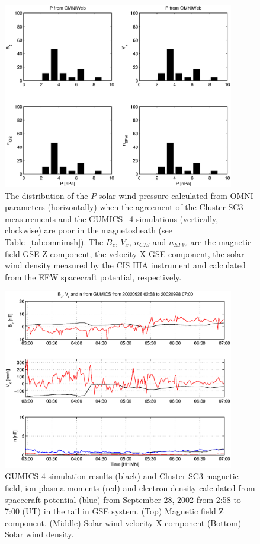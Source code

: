 \documentclass[linenumbers,draft]{agujournal}
\begin{document}
\begin{figure}[h]
\centering
\includegraphics[width=0.9\textwidth,angle=0]{swe-2020-corr-f18.eps}  
\caption{The distribution of the $P$ solar wind pressure calculated from OMNI parameters (horizontally) when the agreement of the Cluster SC3 measurements and the GUMICS$-$4 simulations (vertically, clockwise) are poor in the magnetosheath (see Table~\ref{tab:omnimsh}). The $B_{z}$, $V_{x}$, $n_{CIS}$ and $n_{EFW}$ are the magnetic field GSE Z component, the velocity X GSE component, the solar wind density measured by the CIS HIA instrument and calculated from the EFW spacecraft potential, respectively.}
\label{fig:mshomnip}
\end{figure}

\pagebreak

\begin{figure}[h]
\centering
\includegraphics[width=0.9\textwidth,angle=0]{swe-2020-corr-f19.eps}  
\caption{GUMICS-4 simulation results (black) and Cluster SC3 magnetic field, ion plasma moments (red) and electron density calculated from spacecraft potential (blue) from September 28, 2002 from 2:58 to 7:00 (UT) in the tail in GSE system. (Top) Magnetic field Z component. (Middle) Solar wind velocity X component (Bottom) Solar wind density.}
\label{fig:nsplot}
\end{figure}
\end{document}
